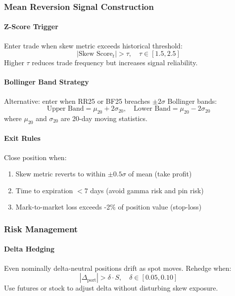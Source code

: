 \subsubsection{Mean Reversion Signal Construction}

\paragraph{Z-Score Trigger}

Enter trade when skew metric exceeds historical threshold:
\[
|\text{Skew Score}_t| > \tau, \quad \tau \in [1.5, 2.5]
\]
Higher $\tau$ reduces trade frequency but increases signal reliability.

\paragraph{Bollinger Band Strategy}

Alternative: enter when RR25 or BF25 breaches $\pm 2 \sigma$ Bollinger bands:
\[
\text{Upper Band} = \mu_{20} + 2 \sigma_{20}, \quad \text{Lower Band} = \mu_{20} - 2 \sigma_{20}
\]
where $\mu_{20}$ and $\sigma_{20}$ are 20-day moving statistics.

\paragraph{Exit Rules}

Close position when:
\begin{enumerate}
  \item Skew metric reverts to within $\pm 0.5 \sigma$ of mean (take profit)
  \item Time to expiration $< 7$ days (avoid gamma risk and pin risk)
  \item Mark-to-market loss exceeds -2\% of position value (stop-loss)
\end{enumerate}

\subsubsection{Risk Management}

\paragraph{Delta Hedging}

Even nominally delta-neutral positions drift as spot moves. Rehedge when:
\[
|\Delta_{\text{port}}| > \delta \cdot S, \quad \delta \in [0.05, 0.10]
\]
Use futures or stock to adjust delta without disturbing skew exposure.

